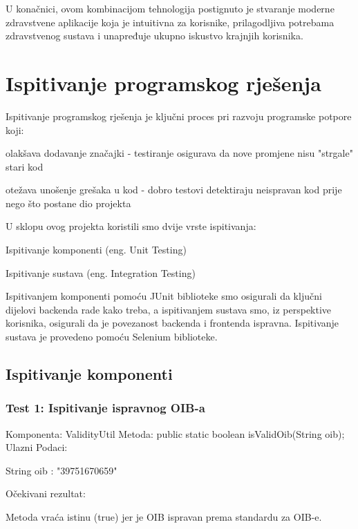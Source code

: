 			 U konačnici, ovom kombinacijom tehnologija postignuto je stvaranje moderne zdravstvene aplikacije koja je intuitivna za korisnike, prilagodljiva potrebama zdravstvenog sustava i unapređuje ukupno iskustvo krajnjih korisnika.
			\eject 
	
		\section{Ispitivanje programskog rješenja}
			Ispitivanje programskog rješenja je ključni proces pri razvoju programske potpore koji:
			\begin{packed_item}
				\item olakšava dodavanje značajki - testiranje osigurava da nove promjene nisu "strgale" stari kod
				\item otežava unošenje grešaka u kod - dobro testovi detektiraju neispravan kod prije nego što postane dio projekta
			\end{packed_item}
			
			U sklopu ovog projekta koristili smo dvije vrste ispitivanja:
			\begin{packed_item}
				\item Ispitivanje komponenti (eng. Unit Testing)
				\item Ispitivanje sustava (eng. Integration Testing)
			\end{packed_item}
			
			Ispitivanjem komponenti pomoću JUnit biblioteke smo osigurali da ključni dijelovi backenda rade kako treba, a ispitivanjem sustava smo, iz perspektive korisnika, osigurali da je povezanost backenda i frontenda ispravna. 
			Ispitivanje sustava je provedeno pomoću Selenium biblioteke.
			
			\subsection{Ispitivanje komponenti}
			\subsubsection*{Test 1: Ispitivanje ispravnog OIB-a}
			Komponenta: ValidityUtil \newline
			Metoda: public static boolean isValidOib(String oib); \newline
			Ulazni Podaci: 
			\begin{packed_item}
				\item String oib : "39751670659"
			\end{packed_item}
			Očekivani rezultat:
			\begin{packed_item}
				\item Metoda vraća istinu (true) jer je OIB ispravan prema standardu za OIB-e.
			\end{packed_item}

